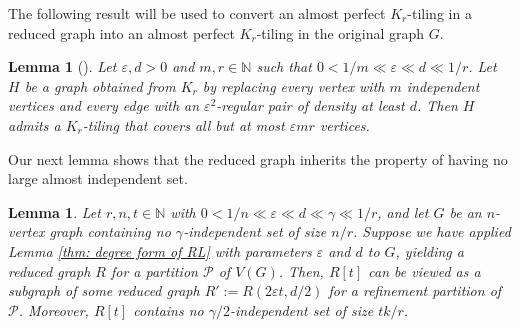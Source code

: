 \documentclass[11pt, a4paper]{article}
\newtheorem{lemma}[theorem]{Lemma}
\theoremstyle{definition}
\newcommand{\eps}{\varepsilon}
\newcommand{\<}{\subseteq}
\begin{document}
The following result will be used to convert an almost perfect $K_r$-tiling in a reduced graph into an almost perfect $K_r$-tiling in the original graph $G$.
\begin{lemma}[\cite{Alon1992}]\label{reduce-original}
    Let $\eps,d>0$ and $m,r\in \mathbb{N}$ such that $0<{1}/{m}\ll \eps\ll d\ll 1/r$. Let $H$ be a graph obtained from $K_r$ by replacing every vertex with $m$ independent  vertices and every edge with an $\eps^2$-regular pair of density at least $d$. Then $H$ admits a $K_r$-tiling that covers all but at most $\eps m r$ vertices.
\end{lemma}
Our next lemma shows that the reduced graph inherits the property of having no large almost independent set. 
\begin{lemma}\label{blow-up}
    Let $r,n,t\in \mathbb{N}$ with  $0<1/n\ll \eps\ll d\ll\gamma\ll 1/r$, and %
    let $G$ be an $n$-vertex graph containing no  $\gamma$-independent set of size ${n}/{r}$. %
    Suppose we have applied Lemma \ref{thm: degree form of RL} with parameters $\eps$ and $d$ 
 to $G$, yielding a reduced graph $R$ for a partition $\mathcal{P}$ of $V(G)$. %
 Then,  $R[t]$ can be viewed as a subgraph of some reduced graph $R':=R(2\eps t,d/2)$ for a refinement partition of $\mathcal{P}$. Moreover, $R[t]$ contains no  ${\gamma}/2$-independent set of size ${tk}/{r}$. 
\end{lemma}
\end{document}
